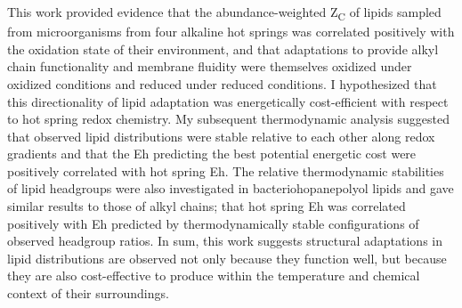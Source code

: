 This work provided evidence that the abundance-weighted Z\textsubscript{C} of lipids sampled from microorganisms from four alkaline hot springs was correlated positively with the oxidation state of their environment, and that adaptations to provide alkyl chain functionality and membrane fluidity were themselves oxidized under oxidized conditions and reduced under reduced conditions. I hypothesized that this directionality of lipid adaptation was energetically cost-efficient with respect to hot spring redox chemistry. My subsequent thermodynamic analysis suggested that observed lipid distributions were stable relative to each other along redox gradients and that the Eh predicting the best potential energetic cost were positively correlated with hot spring Eh. The relative thermodynamic stabilities of lipid headgroups were also investigated in bacteriohopanepolyol lipids and gave similar results to those of alkyl chains; that hot spring Eh was correlated positively with Eh predicted by thermodynamically stable configurations of observed headgroup ratios. In sum, this work suggests structural adaptations in lipid distributions are observed not only because they function well, but because they are also cost-effective to produce within the temperature and chemical context of their surroundings.